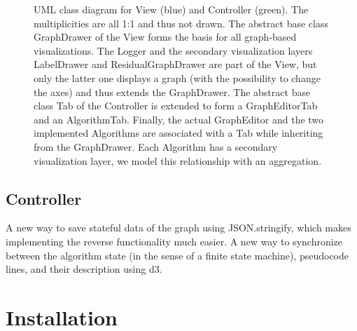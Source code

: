\begin{figure}
\caption{UML class diagram for View (blue) and Controller (green). The multiplicities are all 1:1 and thus not drawn. The abstract base class GraphDrawer of the View forms the basis for all graph-based visualizations. The Logger and the secondary visualization layers LabelDrawer and ResidualGraphDrawer are part of the View, but only the latter one displays a graph (with the possibility to change the axes) and thus extends the GraphDrawer. The abstract base class Tab of the Controller is extended to form a GraphEditorTab and an AlgorithmTab. Finally, the actual GraphEditor and the two implemented Algorithms are associated with a Tab while inheriting from the GraphDrawer. Each Algorithm has a secondary visualization layer, we model this relationship with an aggregation.}
\end{figure}


\subsection{Controller}
	A new way to save stateful data of the graph using JSON.stringify, which makes implementing the reverse functionality much easier. A new way to synchronize between the algorithm state (in the sense of a finite state machine), pseudocode lines, and their description using d3.



\section{Installation}\label{sec:installation}
